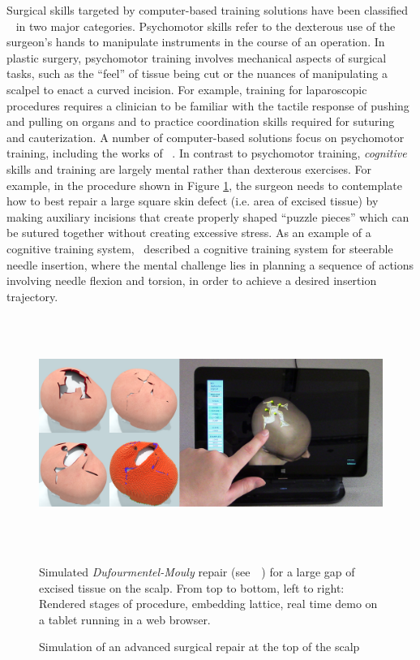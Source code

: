 Surgical skills targeted by computer-based training solutions have
been classified ~\cite{GallaRCHFMSS:2005} in two major
categories. Psychomotor skills refer to the dexterous use of the
surgeon's hands to manipulate instruments in the course of an
operation. In plastic surgery, psychomotor training involves
mechanical aspects of surgical tasks, such as the ``feel'' of tissue
being cut or the nuances of manipulating a scalpel to enact a curved
incision. For example, training for laparoscopic procedures requires a
clinician to be familiar with the tactile response of pushing and
pulling on organs and to practice coordination skills required for
suturing and cauterization.  A number of computer-based solutions
focus on psychomotor training, including the works of
~\cite{MendoL:2003,DeKLS:2005,KimCDS:2007,LindbT:2007}.  In contrast to
psychomotor training, \emph{cognitive} skills and training are largely
mental rather than dexterous exercises. For example, in the procedure
shown in Figure \ref{fig:gridiron-teaser}, the surgeon needs to
contemplate how to best repair a large square skin defect (i.e. area
of excised tissue) by making auxiliary incisions that create properly
shaped ``puzzle pieces'' which can be sutured together without
creating excessive stress. As an example of a cognitive training
system,~\cite{ChentARCHGSO:2009} described a cognitive training system
for steerable needle insertion, where the mental challenge lies in
planning a sequence of actions involving needle flexion and torsion,
in order to achieve a desired insertion trajectory.

\begin{figure}
  \includegraphics[height=2.99in]{chapter_gridiron/images/TitleImage.png}
  \caption{Simulation of an advanced surgical repair at the top of the
    scalp}{Simulated \textit{Dufourmentel-Mouly} repair (see\
    \protect~\cite{Baker:2014}) for a large gap of excised tissue on
    the scalp. From top to bottom, left to right: Rendered stages of
    procedure, embedding lattice, real time demo on a tablet running
    in a web browser.}
  \label{fig:gridiron-teaser}
\end{figure}

